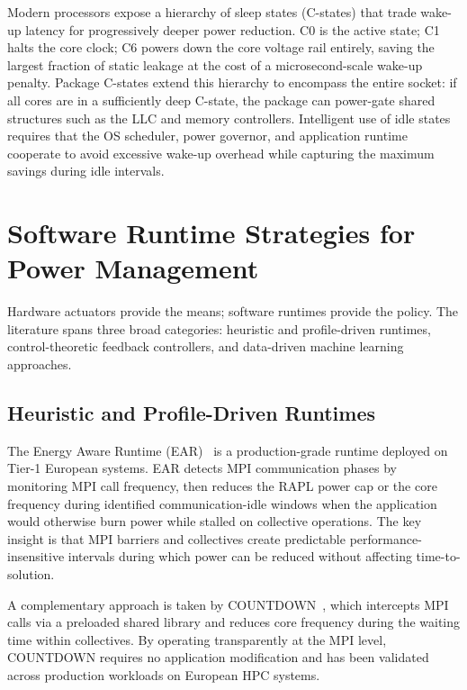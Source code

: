 Modern processors expose a hierarchy of sleep states (C-states) that trade
wake-up latency for progressively deeper power reduction.  C0 is the active
state; C1 halts the core clock; C6 powers down the core voltage rail
entirely, saving the largest fraction of static leakage at the cost of a
microsecond-scale wake-up penalty.  Package C-states extend this hierarchy to
encompass the entire socket: if all cores are in a sufficiently deep C-state,
the package can power-gate shared structures such as the LLC and memory
controllers.  Intelligent use of idle states requires that the OS scheduler,
power governor, and application runtime cooperate to avoid excessive wake-up
overhead while capturing the maximum savings during idle intervals.

\section{Software Runtime Strategies for Power Management}

Hardware actuators provide the means; software runtimes provide the policy.
The literature spans three broad categories: heuristic and profile-driven
runtimes, control-theoretic feedback controllers, and data-driven machine
learning approaches.

\subsection{Heuristic and Profile-Driven Runtimes}

The Energy Aware Runtime (EAR)~\cite{corbalan2019ear} is a production-grade
runtime deployed on Tier-1 European systems.  EAR detects MPI communication
phases by monitoring MPI call frequency, then reduces the RAPL power cap or the
core frequency during identified communication-idle windows when the application
would otherwise burn power while stalled on collective operations.
The key insight is that MPI barriers and collectives create predictable
performance-insensitive intervals during which power can be reduced without
affecting time-to-solution.

A complementary approach is taken by COUNTDOWN~\cite{countdown2021libri}, which
intercepts MPI calls via a preloaded shared library and reduces core frequency
during the waiting time within collectives.  By operating transparently at the
MPI level, COUNTDOWN requires no application modification and has been validated
across production workloads on European HPC systems.

